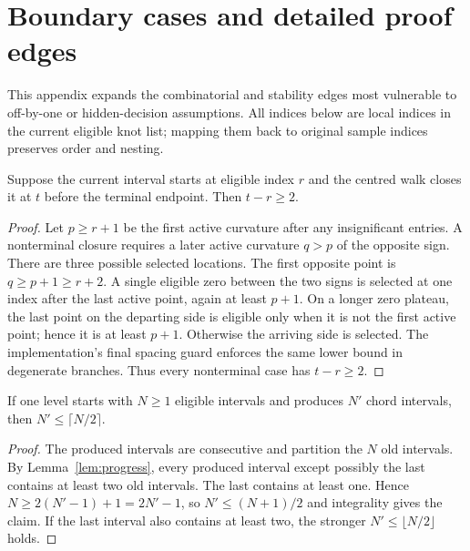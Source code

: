 \section{Boundary cases and detailed proof edges}
\label{app:proofs}

This appendix expands the combinatorial and stability edges most vulnerable to
off-by-one or hidden-decision assumptions.  All indices below are local indices
in the current eligible knot list; mapping them back to original sample indices
preserves order and nesting.

\begin{lemma}
\label{lem:progress}
Suppose the current interval starts at eligible index $r$ and the centred walk
closes it at $t$ before the terminal endpoint.  Then $t-r\ge2$.
\end{lemma}
\begin{proof}
Let $p\ge r+1$ be the first active curvature after any insignificant entries.
A nonterminal closure requires a later active curvature $q>p$ of the opposite
sign.  There are three possible selected locations.  The first opposite point
is $q\ge p+1\ge r+2$.  A single eligible zero between the two signs is selected
at one index after the last active point, again at least $p+1$.  On a longer
zero plateau, the last point on the departing side is eligible only when it is
not the first active point; hence it is at least $p+1$.  Otherwise the arriving
side is selected.  The implementation's final spacing guard enforces the same
lower bound in degenerate branches.  Thus every nonterminal case has
$t-r\ge2$.
\end{proof}

\begin{lemma}
\label{lem:halving}
If one level starts with $N\ge1$ eligible intervals and produces $N'$ chord
intervals, then $N'\le\lceil N/2\rceil$.
\end{lemma}
\begin{proof}
The produced intervals are consecutive and partition the $N$ old intervals.
By Lemma~\ref{lem:progress}, every produced interval except possibly the last
contains at least two old intervals.  The last contains at least one.  Hence
$N\ge2(N'-1)+1=2N'-1$, so $N'\le(N+1)/2$ and integrality gives the claim.  If
the last interval also contains at least two, the stronger
$N'\le\lfloor N/2\rfloor$ holds.
\end{proof}

